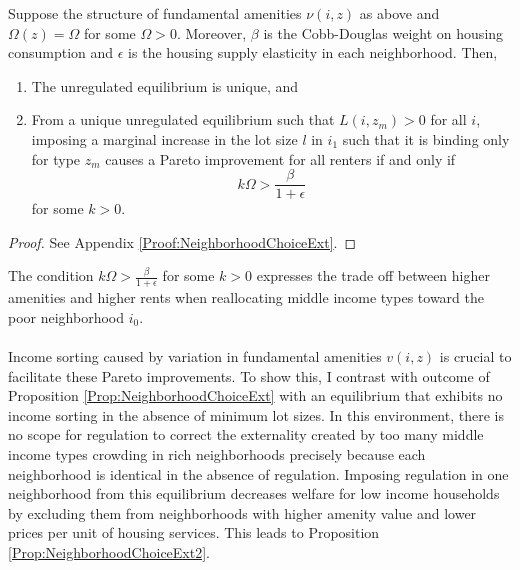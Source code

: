 \documentclass[11pt]{article}
\begin{document}
	\begin{Proposition}\label{Prop:NeighborhoodChoiceExt}
		Suppose the structure of fundamental amenities $\nu(i, z)$ as above and $\Omega(z) = \Omega$ for some $\Omega > 0$. Moreover, $\beta$ is the Cobb-Douglas weight on housing consumption and $\epsilon$ is the housing supply elasticity in each neighborhood. Then,
		
		\begin{enumerate}
			\item The unregulated equilibrium is unique, and 
			
			\item From a unique unregulated equilibrium such that $L(i, z_{m}) > 0$ for all $i$, imposing a marginal increase in the lot size $l$ in $i_{1}$ such that it is binding only for type $z_{m}$ causes a Pareto improvement for all renters if and only if $$k \Omega > \frac{\beta}{1 + \epsilon}$$ for some $k > 0$. 
		\end{enumerate}
	\end{Proposition}
	
	\begin{proof}
		See Appendix \ref{Proof:NeighborhoodChoiceExt}.
	\end{proof}
	\noindent The condition $k \Omega > \frac{\beta}{1 + \epsilon}$ for some $k > 0$ expresses the trade off between higher amenities and higher rents when reallocating middle income types toward the poor neighborhood $i_{0}$. 
	
	\paragraph*{}
	Income sorting caused by variation in fundamental amenities $v(i, z)$ is crucial to facilitate these Pareto improvements. To show this, I contrast with outcome of Proposition \ref{Prop:NeighborhoodChoiceExt} with an equilibrium that exhibits no income sorting in the absence of minimum lot sizes. In this environment, there is no scope for regulation to correct the externality created by too many middle income types crowding in rich neighborhoods precisely because each neighborhood is identical in the absence of regulation. Imposing regulation in one neighborhood from this equilibrium decreases welfare for low income households by excluding them from neighborhoods with higher amenity value and lower prices per unit of housing services. This leads to Proposition \ref{Prop:NeighborhoodChoiceExt2}.
	
\end{document}
